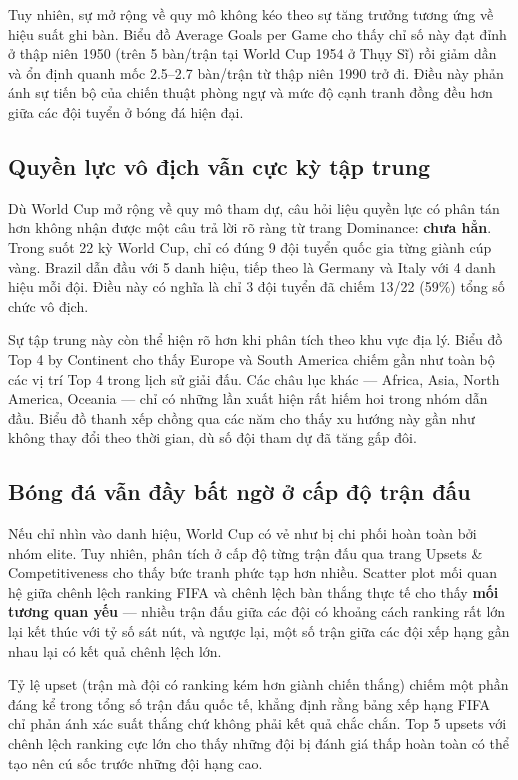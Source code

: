\documentclass[12pt,a4paper]{article}
\begin{document}
Tuy nhiên, sự mở rộng về quy mô không kéo theo sự tăng trưởng tương ứng về hiệu suất ghi bàn. Biểu đồ Average Goals per Game cho thấy chỉ số này đạt đỉnh ở thập niên 1950 (trên 5 bàn/trận tại World Cup 1954 ở Thụy Sĩ) rồi giảm dần và ổn định quanh mốc 2.5--2.7 bàn/trận từ thập niên 1990 trở đi. Điều này phản ánh sự tiến bộ của chiến thuật phòng ngự và mức độ cạnh tranh đồng đều hơn giữa các đội tuyển ở bóng đá hiện đại.

\subsection{Quyền lực vô địch vẫn cực kỳ tập trung}
Dù World Cup mở rộng về quy mô tham dự, câu hỏi liệu quyền lực có phân tán hơn không nhận được một câu trả lời rõ ràng từ trang Dominance: \textbf{chưa hẳn}. Trong suốt 22 kỳ World Cup, chỉ có đúng 9 đội tuyển quốc gia từng giành cúp vàng. Brazil dẫn đầu với 5 danh hiệu, tiếp theo là Germany và Italy với 4 danh hiệu mỗi đội. Điều này có nghĩa là chỉ 3 đội tuyển đã chiếm 13/22 (59\%) tổng số chức vô địch.

Sự tập trung này còn thể hiện rõ hơn khi phân tích theo khu vực địa lý. Biểu đồ Top 4 by Continent cho thấy Europe và South America chiếm gần như toàn bộ các vị trí Top 4 trong lịch sử giải đấu. Các châu lục khác --- Africa, Asia, North America, Oceania --- chỉ có những lần xuất hiện rất hiếm hoi trong nhóm dẫn đầu. Biểu đồ thanh xếp chồng qua các năm cho thấy xu hướng này gần như không thay đổi theo thời gian, dù số đội tham dự đã tăng gấp đôi.

\subsection{Bóng đá vẫn đầy bất ngờ ở cấp độ trận đấu}
Nếu chỉ nhìn vào danh hiệu, World Cup có vẻ như bị chi phối hoàn toàn bởi nhóm elite. Tuy nhiên, phân tích ở cấp độ từng trận đấu qua trang Upsets \& Competitiveness cho thấy bức tranh phức tạp hơn nhiều. Scatter plot mối quan hệ giữa chênh lệch ranking FIFA và chênh lệch bàn thắng thực tế cho thấy \textbf{mối tương quan yếu} --- nhiều trận đấu giữa các đội có khoảng cách ranking rất lớn lại kết thúc với tỷ số sát nút, và ngược lại, một số trận giữa các đội xếp hạng gần nhau lại có kết quả chênh lệch lớn.

Tỷ lệ upset (trận mà đội có ranking kém hơn giành chiến thắng) chiếm một phần đáng kể trong tổng số trận đấu quốc tế, khẳng định rằng bảng xếp hạng FIFA chỉ phản ánh xác suất thắng chứ không phải kết quả chắc chắn. Top 5 upsets với chênh lệch ranking cực lớn cho thấy những đội bị đánh giá thấp hoàn toàn có thể tạo nên cú sốc trước những đội hạng cao.
\end{document}
